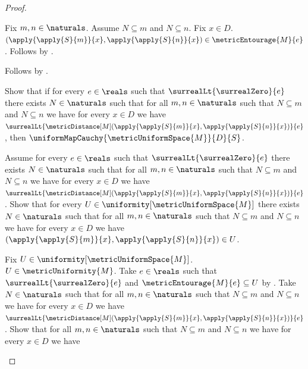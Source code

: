 \begin{proof}
\begin{subproof}
        \begin{subproof}
            Fix $m,n\in\naturals$.
            Assume $N\subseteq m$ and $N\subseteq n$.
            Fix $x\in D$.
            $(\apply{\apply{S}{m}}{x},
             \apply{\apply{S}{n}}{x})\in\metricEntourage{M}{e}$.
            Follows by .
        \end{subproof}
        Follows by \auto.
    \end{subproof}
    Show that if for every $e\in\reals$ such that
        $\surrealLt{\surrealZero}{e}$ there exists $N\in\naturals$
        such that for all $m,n\in\naturals$ such that
            $N\subseteq m$ and $N\subseteq n$ we have
            for every $x\in D$ we have
            $\surrealLt{\metricDistance[M]
                (\apply{\apply{S}{m}}{x},
                 \apply{\apply{S}{n}}{x})}{e}$, then
        $\uniformMapCauchy{\metricUniformSpace{M}}{D}{S}$.
    \begin{subproof}
        Assume for every $e\in\reals$ such that
            $\surrealLt{\surrealZero}{e}$ there exists $N\in\naturals$
            such that for all $m,n\in\naturals$ such that
                $N\subseteq m$ and $N\subseteq n$ we have
                for every $x\in D$ we have
                $\surrealLt{\metricDistance[M]
                    (\apply{\apply{S}{m}}{x},
                     \apply{\apply{S}{n}}{x})}{e}$.
        Show that for every
            $U\in\uniformity[\metricUniformSpace{M}]$ there exists
            $N\in\naturals$ such that for all $m,n\in\naturals$
            such that $N\subseteq m$ and $N\subseteq n$ we have
            for every $x\in D$ we have
                $(\apply{\apply{S}{m}}{x},
                 \apply{\apply{S}{n}}{x})\in U$.
        \begin{subproof}
            Fix $U\in\uniformity[\metricUniformSpace{M}]$.
            $U\in\metricUniformity{M}$.
            Take $e\in\reals$ such that
                $\surrealLt{\surrealZero}{e}$ and
                $\metricEntourage{M}{e}\subseteq U$
                by .
            Take $N\in\naturals$ such that for all $m,n\in\naturals$
                such that $N\subseteq m$ and $N\subseteq n$ we have
                for every $x\in D$ we have
                $\surrealLt{\metricDistance[M]
                    (\apply{\apply{S}{m}}{x},
                     \apply{\apply{S}{n}}{x})}{e}$.
            Show that for all $m,n\in\naturals$ such that
                $N\subseteq m$ and $N\subseteq n$ we have
                for every $x\in D$ we have

\end{subproof}
\end{subproof}
\end{proof}
